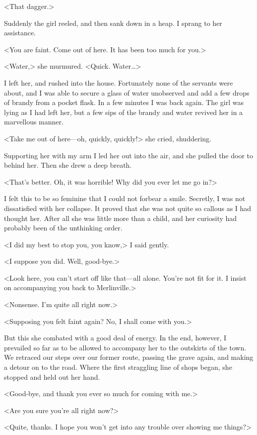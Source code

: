  <That dagger.> 

 Suddenly the girl reeled, and then sank down in a heap. I sprang to her assistance. 

 <You are faint. Come out of here. It has been too much for you.> 

 <Water,> she murmured. <Quick. Water\dots> 

 I left her, and rushed into the house. Fortunately none of the servants were about, and I was able to secure a glass of water unobserved and add a few drops of brandy from a pocket flask. In a few minutes I was back again. The girl was lying as I had left her, but a few sips of the brandy and water revived her in a marvellous manner. 

 <Take me out of here—oh, quickly, quickly!> she cried, shuddering. 

 Supporting her with my arm I led her out into the air, and she pulled the door to behind her. Then she drew a deep breath. 

 <That's better. Oh, it was horrible! Why did you ever let me go in?> 

 I felt this to be so feminine that I could not forbear a smile. Secretly, I was not dissatisfied with her collapse. It proved that she was not quite so callous as I had thought her. After all she was little more than a child, and her curiosity had probably been of the unthinking order. 

 <I did my best to stop you, you know,> I said gently. 

 <I suppose you did. Well, good-bye.> 

 <Look here, you can't start off like that—all alone. You're not fit for it. I insist on accompanying you back to Merlinville.> 

 <Nonsense. I'm quite all right now.> 

 <Supposing you felt faint again? No, I shall come with you.> 

 But this she combated with a good deal of energy. In the end, however, I prevailed so far as to be allowed to accompany her to the outskirts of the town. We retraced our steps over our former route, passing the grave again, and making a detour on to the road. Where the first straggling line of shops began, she stopped and held out her hand. 

 <Good-bye, and thank you ever so much for coming with me.> 

 <Are you sure you're all right now?> 

 <Quite, thanks. I hope you won't get into any trouble over showing me things?> 

